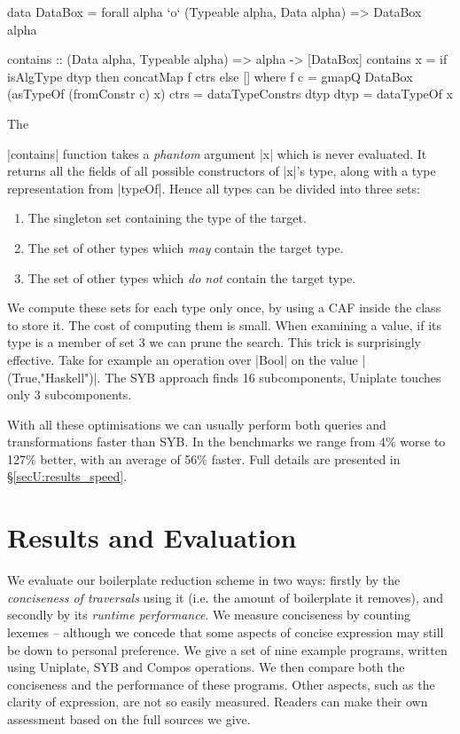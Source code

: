 \ignore\begin{code}
data DataBox = forall alpha `o` (Typeable alpha, Data alpha) => DataBox alpha

contains :: (Data alpha, Typeable alpha) => alpha -> [DataBox]
contains x = if isAlgType dtyp then concatMap f ctrs else []
    where
        f c = gmapQ DataBox (asTypeOf (fromConstr c) x)
        ctrs = dataTypeConstrs dtyp
        dtyp = dataTypeOf x
\end{code}

The \ignore|contains| function takes a \textit{phantom} argument |x| which is never evaluated. It returns all the fields of all possible constructors of |x|'s type, along with a type representation from |typeOf|. Hence all types can be divided into three sets:

\begin{enumerate}
\item The singleton set containing the type of the target.
\item The set of other types which \textit{may} contain the target type.
\item The set of other types which \textit{do not} contain the target type.
\end{enumerate}

We compute these sets for each type only once, by using a CAF inside the class to store it. The cost of computing them is small. When examining a value, if its type is a member of set 3 we can prune the search. This trick is surprisingly effective. Take for example an operation over |Bool| on the value |(True,"Haskell")|. The SYB approach finds 16 subcomponents, Uniplate touches only 3 subcomponents.

With all these optimisations we can usually perform both queries and transformations faster than SYB. In the benchmarks we range from 4\% worse to 127\% better, with an average of 56\% faster. Full details are presented in \S\ref{secU:results_speed}.


\section{Results and Evaluation}
\label{secU:results}

We evaluate our boilerplate reduction scheme in two ways: firstly by the \textit{conciseness of traversals} using it (i.e. the amount of boilerplate it removes), and secondly by its \textit{runtime performance}. We measure conciseness by counting lexemes -- although we concede that some aspects of concise expression may still be down to personal preference. We give a set of nine example programs, written using Uniplate, SYB and Compos operations. We then compare both the conciseness and the performance of these programs. Other aspects, such as the clarity of expression, are not so easily measured. Readers can make their own assessment based on the full sources we give.

